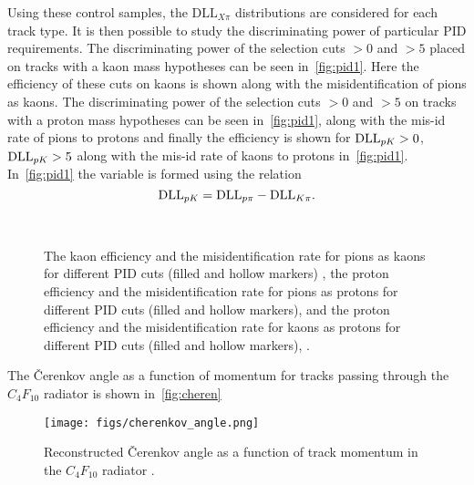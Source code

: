 Using these control samples, the $\text{DLL}_{X\pi}$ distributions are considered for each track type. It is then possible to study the discriminating power of particular PID requirements. The discriminating power of the selection cuts \dllkpi$>0$ and \dllkpi$>5$ placed on tracks with a kaon mass hypotheses can be seen in~\autoref{fig:pid1}\protect{}. Here the efficiency of these cuts on kaons is shown along with the misidentification of pions as kaons.
 The discriminating power of the selection cuts \dllppi$>0$ and \dllppi$>5$ on tracks with a proton mass hypotheses can be seen in~\autoref{fig:pid1}\protect{}, along with the mis-id rate of pions to protons and finally the efficiency is shown for $\mathrm{DLL}_{{p}{K}}>0$, $\mathrm{DLL}_{{p}{K}}>5$ along with the mis-id rate of kaons to protons in~\autoref{fig:pid1}\protect{}. In~\autoref{fig:pid1}\protect{} the variable \dllpk is formed using the relation
\begin{equation}
  \mathrm{DLL}_{{p}{K}} = \mathrm{DLL}_{{p}{\pi}} - \mathrm{DLL}_{{K}{\pi}}.
\end{equation}

\begin{figure}[h!]
  \centering
      \\
      \caption{The kaon efficiency and the misidentification rate for pions as kaons for different PID cuts (filled and hollow markers) \protect{}, the proton efficiency and the misidentification rate for pions as protons for different PID cuts (filled and hollow markers), \protect{} and the proton efficiency and the misidentification rate for kaons as protons for different PID cuts (filled and hollow markers), \protect{} \cite{LHCb-DP-2012-003}.}
  \label{fig:pid1}
\end{figure}

The \v{C}erenkov angle as a function of momentum for tracks passing through the $C_{4}F_{10}$ radiator is shown in~\autoref{fig:cheren}
\begin{figure}[h!]
  \centering
  \texttt{[image: figs/cherenkov\_angle.png]} 
  \caption{Reconstructed \v{C}erenkov angle as a function of track momentum in the $C_{4}F_{10}$ radiator \cite{LHCb-DP-2012-003}.
  }
  \label{fig:cheren}
\end{figure}





